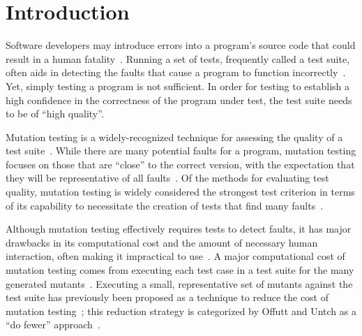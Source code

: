 
\section{Introduction}



Software developers may introduce errors into a program's source code that could result in a human
fatality~\cite{vicente2003programming}. Running a set of tests, frequently called a test suite, often aids in detecting
the faults that cause a program to function incorrectly~\cite{wagner2005comparing}. Yet, simply testing a program is not
sufficient. In order for testing to establish a high confidence in the correctness of the program under test, the test
suite needs to be of ``high quality''.


Mutation testing is a widely-recognized technique for assessing the quality of a test suite~\cite{gopinath2015mutation}.
While there are many potential faults for a program, mutation testing focuses on those that are ``close'' to the correct
version, with the expectation that they will be representative of all faults~\cite{jia2011analysis}. Of the methods for
evaluating test quality, mutation testing is widely considered the strongest test criterion in terms of its capability
to necessitate the creation of tests that find many faults~\cite{ammann2008introduction}.


Although mutation testing effectively requires tests to detect faults, it has major drawbacks in its computational cost
and the amount of necessary human interaction, often making it impractical to use~\cite{gopinath2015mutation,
wong1995reducing, gopinath2015empirical}.  A major computational cost of mutation testing comes from executing each test
case in a test suite for the many generated mutants~\cite{offutt1993experimental}. Executing a small, representative set
of mutants against the test suite has previously been proposed as a technique to reduce the cost of mutation
testing~\cite{jia2011analysis, wong1995reducing, offutt1993experimental}; this reduction strategy is categorized by
Offutt and Untch as a ``do fewer'' approach~\cite{offutt2001mutation}.

